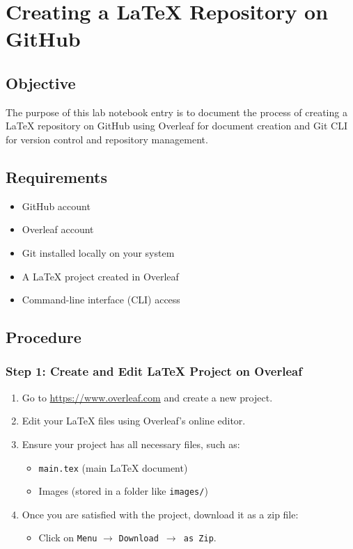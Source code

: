 \section{Creating a LaTeX Repository on GitHub}
\subsection{Objective}
The purpose of this lab notebook entry is to document the process of creating a LaTeX repository on GitHub using Overleaf for document creation and Git CLI for version control and repository management.

\subsection{Requirements}
\begin{itemize}
    \item GitHub account 
    \item Overleaf account 
    \item Git installed locally on your system 
    \item A LaTeX project created in Overleaf
    \item Command-line interface (CLI) access
\end{itemize}

\subsection{Procedure}

\subsubsection{Step 1: Create and Edit LaTeX Project on Overleaf}
\begin{enumerate}
    \item Go to \url{https://www.overleaf.com} and create a new project.
    \item Edit your LaTeX files using Overleaf’s online editor.
    \item Ensure your project has all necessary files, such as:
    \begin{itemize}
        \item \texttt{main.tex} (main LaTeX document)
        \item Images (stored in a folder like \texttt{images/})
    \end{itemize}
    \item Once you are satisfied with the project, download it as a zip file:
    \begin{itemize}
        \item Click on \texttt{Menu} $\rightarrow$ \texttt{Download $\rightarrow$ as Zip}.
    \end{itemize}
\end{enumerate}

